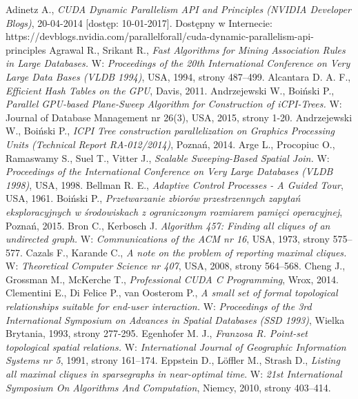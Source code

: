 \documentclass[12pt]{article}
\begin{document}
\begin{thebibliography}{}
Adinetz A., \textit{CUDA Dynamic Parallelism API and Principles (NVIDIA Developer Blogs)}, 20-04-2014 [dostęp: 10-01-2017]. Dostępny w Internecie: https://devblogs.nvidia.com/parallelforall/cuda-dynamic-parallelism-api-principles
Agrawal R., Srikant R., \textit{Fast Algorithms for Mining Association Rules in Large Databases.} W: \textit{Proceedings of the 20th International Conference on Very Large Data Bases (VLDB 1994)}, USA, 1994, strony 487–499.
Alcantara D. A. F., \textit{Efficient Hash Tables on the GPU}, Davis, 2011.
Andrzejewski W., Boiński P., \textit{Parallel GPU-based Plane-Sweep Algorithm for Construction of iCPI-Trees.} W: Journal of Database Management nr 26(3), USA, 2015, strony 1-20.
Andrzejewski W., Boiński P., \textit{ICPI Tree construction parallelization on Graphics Processing Units
(Technical Report RA-012/2014)}, Poznań, 2014.
Arge L., Procopiuc O., Ramaswamy S., Suel T., Vitter J., \textit{Scalable Sweeping-Based Spatial Join.} W: \textit{Proceedings of the International Conference on Very Large Databases (VLDB 1998)}, USA, 1998.
Bellman R. E., \textit{Adaptive Control Processes - A Guided Tour}, USA, 1961.
Boiński P., \textit{Przetwarzanie zbiorów przestrzennych zapytań eksploracyjnych w środowiskach z ograniczonym rozmiarem pamięci operacyjnej}, Poznań, 2015.
Bron C., Kerbosch J. \textit{Algorithm 457: Finding all cliques of an undirected graph.} W: \textit{Communications of the ACM nr 16}, USA, 1973, strony 575–577.
Cazals F., Karande C., \textit{A note on the problem of reporting maximal cliques.} W:\textit{ Theoretical Computer Science nr 407}, USA, 2008, strony 564–568.
Cheng J., Grossman M., McKerche T., \textit{Professional CUDA C Programming}, Wrox, 2014.
Clementini E., Di Felice P., van Oosterom P., \textit{A small set of formal topological relationships suitable for end-user interaction.} W: \textit{Proceedings of the 3rd International Symposium on Advances in Spatial Databases (SSD 1993)}, Wielka Brytania, 1993, strony 277-295.
Egenhofer M. J., \textit{Franzosa R. Point-set topological spatial relations.} W: \textit{International Journal of Geographic Information Systems nr 5}, 1991, strony 161–174.
Eppstein D., Löffler M., Strash D., \textit{Listing all maximal cliques in sparsegraphs in near-optimal time}. W: \textit{21st International Symposium On Algorithms And Computation}, Niemcy, 2010, strony 403–414.

\end{thebibliography}
\end{document}
